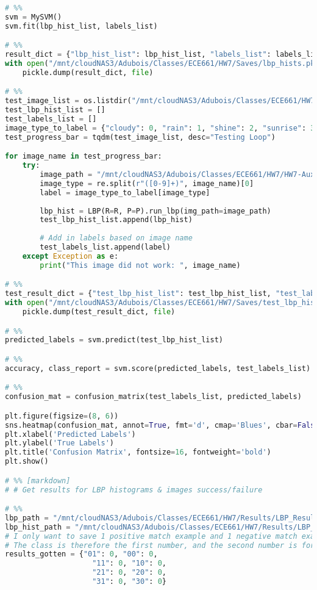 \documentclass{article}
\begin{document}
\begin{lstlisting}[language=Python]
# %%
svm = MySVM()
svm.fit(lbp_hist_list, labels_list)

# %%
result_dict = {"lbp_hist_list": lbp_hist_list, "labels_list": labels_list}
with open("/mnt/cloudNAS3/Adubois/Classes/ECE661/HW7/Saves/lbp_hists.pkl", "wb") as file:
    pickle.dump(result_dict, file)

# %%
test_image_list = os.listdir("/mnt/cloudNAS3/Adubois/Classes/ECE661/HW7/HW7-Auxilliary/data/testing/")
test_lbp_hist_list = []
test_labels_list = []
image_type_to_label = {"cloudy": 0, "rain": 1, "shine": 2, "sunrise": 3}
test_progress_bar = tqdm(test_image_list, desc="Testing Loop")

for image_name in test_progress_bar:
    try:
        image_path = "/mnt/cloudNAS3/Adubois/Classes/ECE661/HW7/HW7-Auxilliary/data/testing/" + image_name
        image_type = re.split(r"([0-9]+)", image_name)[0]
        label = image_type_to_label[image_type]
        
        lbp_hist = LBP(R=R, P=P).run_lbp(img_path=image_path)
        test_lbp_hist_list.append(lbp_hist)
    
        # Add in labels based on image name
        test_labels_list.append(label)
    except Exception as e:
        print("This image did not work: ", image_name)

# %%
test_result_dict = {"test_lbp_hist_list": test_lbp_hist_list, "test_labels_list": test_labels_list}
with open("/mnt/cloudNAS3/Adubois/Classes/ECE661/HW7/Saves/test_lbp_hists.pkl", "wb") as file:
    pickle.dump(test_result_dict, file)

# %%
predicted_labels = svm.predict(test_lbp_hist_list)

# %%
accuracy, class_report = svm.score(predicted_labels, test_labels_list)

# %%
confusion_mat = confusion_matrix(test_labels_list, predicted_labels)

plt.figure(figsize=(8, 6))
sns.heatmap(confusion_mat, annot=True, fmt='d', cmap='Blues', cbar=False)
plt.xlabel('Predicted Labels')
plt.ylabel('True Labels')
plt.title('Confusion Matrix', fontsize=16, fontweight='bold')
plt.show()

# %% [markdown]
# # Get results for LBP histograms & images success/failure

# %%
lbp_path = "/mnt/cloudNAS3/Adubois/Classes/ECE661/HW7/Results/LBP_Results/"
lbp_hist_path = "/mnt/cloudNAS3/Adubois/Classes/ECE661/HW7/Results/LBP_Hists/"
# I only want to save 1 positive match example and 1 negative match example for each class
# The class is therefore the first number, and the second number is for matching labels or not
results_gotten = {"01": 0, "00": 0,
                    "11": 0, "10": 0,
                    "21": 0, "20": 0,
                    "31": 0, "30": 0}


\end{lstlisting}
\end{document}
